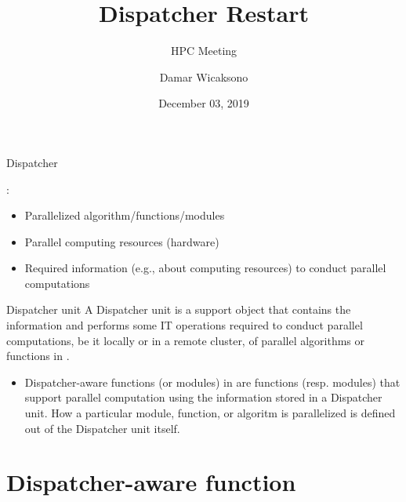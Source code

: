 \documentclass{rsuqbeamernew}
\title[HPC Meeting]{Dispatcher Restart}
\subtitle{HPC Meeting}
\institute[Chair of Risk \& Safety] {}
\author[D. Wicaksono]{Damar Wicaksono}
\date[December 03, 2019] {\small December 03, 2019}
\begin{document}
\begin{frame}[t]{Dispatcher}
  \small

  :
  \begin{itemize}
    \item Parallelized algorithm/functions/modules
    \item Parallel computing resources (hardware)
    \item Required information (e.g., about computing resources) to conduct parallel computations
  \end{itemize}

  \begin{block}{Dispatcher unit}
    A Dispatcher unit is a support object that {\altx contains} the information and {\altx performs} some IT operations required to conduct parallel computations, be it locally or in a remote cluster, of parallel algorithms or functions in \uqlab.
  \end{block}
  
  
  \begin{itemize}
    \item[] {\altx Dispatcher-aware} functions (or modules) in \uqlab{} are functions (resp. modules) that support parallel computation using the information stored in a Dispatcher unit. How a particular module, function, or algoritm is parallelized is defined out of the Dispatcher unit itself.
  \end{itemize}

\end{frame}

\section{Dispatcher-aware function}
\secoutline
\end{document}
